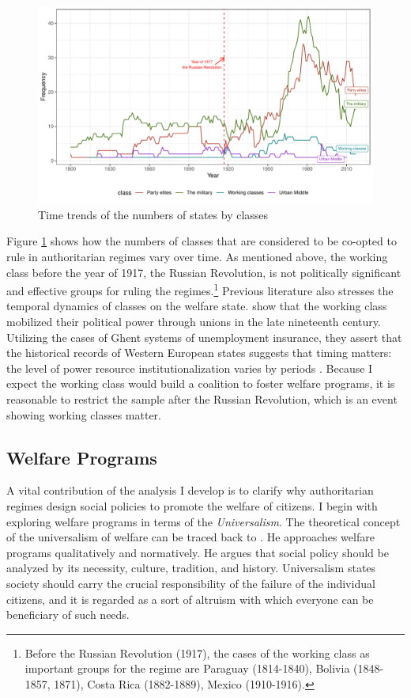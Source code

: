 \documentclass[11pt, notitlepage]{article}
\begin{document}
\begin{figure}[!htbt]
	\centering
	\includegraphics[width=1\linewidth]{"../3. Datasets_Codebooks/Figures/Plot3"}
	\caption{Time trends of the numbers of states by classes}
	\label{fig:plot2}
\end{figure}

Figure \ref{fig:plot2} shows how the numbers of classes that are considered to be co-opted to rule in authoritarian regimes vary over time. As mentioned above, the working class before the year of 1917, the Russian Revolution, is not politically significant and effective groups for ruling the regimes.\footnote{Before the Russian Revolution (1917), the cases of the working class as important groups for the regime are Paraguay (1814-1840), Bolivia (1848-1857, 1871), Costa Rica (1882-1889), Mexico (1910-1916).} Previous literature also stresses the temporal dynamics of classes on the welfare state. \citet{Rasmussen2018} show that the working class mobilized their political power through unions in the late nineteenth century. Utilizing the cases of Ghent systems of unemployment insurance, they assert that the historical records of Western European states suggests that timing matters: the level of power resource institutionalization varies by periods \citep[821-822]{Rasmussen2018}. Because I expect the working class would build a coalition to foster welfare programs, it is reasonable to restrict the sample after the Russian Revolution, which is an event showing working classes matter. 


\subsection{Welfare Programs}

A vital contribution of the analysis I develop is to clarify why authoritarian regimes design social policies to promote the welfare of citizens. I begin with exploring welfare programs in terms of the \textit{Universalism}. The theoretical concept of the universalism of welfare can be traced back to \citet{Titmuss1974}. He approaches welfare programs qualitatively and normatively. He argues that social policy should be analyzed by its necessity, culture, tradition, and history. Universalism states society should carry the crucial responsibility of the failure of the individual citizens, and it is regarded as a sort of altruism with which everyone can be beneficiary of such needs. 
\end{document}
